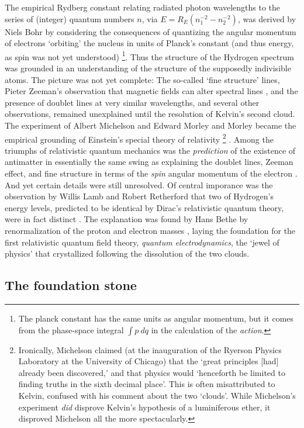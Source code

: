 	The empirical Rydberg constant relating radiated photon wavelengths to the series of (integer) quantum numbers $n$, via $E=R_E(n_{1}^{-2}-n_{2}^{-2})$, was derived by Niels Bohr by considering the consequences of quantizing the angular momentum of electrons `orbiting' the nucleus in units of Planck's constant (and thus energy, as spin was not yet understood) \cite{Bohr1913}
	\footnote{The planck constant has the same units as angular momentum, but it comes from the phase-space integral $\int p~dq$ in the calculation of the \emph{action}.}.
	Thus the structure of the Hydrogen spectrum was grounded in an understanding of the structure of the supposedly indivisible atoms. 
	The picture was not yet complete: The so-called `fine structure' lines, Pieter Zeeman's observation that magnetic fields can alter spectral lines \cite{Zeeman1897}, and the presence of doublet lines at very similar wavelengths, and several other observations, remained unexplained until the resolution of Kelvin's second cloud.
	The experiment of Albert Michelson and Edward Morley and Morley became the empirical grounding of Einstein's special theory of relativity 
	\footnote{Ironically, Michelson claimed (at the inauguration of the Ryerson Physics Laboratory at the University of Chicago) that the `great principles [had] already been discovered,' and that physics would `henceforth be limited to finding truths in the sixth decimal place'. This is often misattributed to Kelvin, confused with his comment about the two `clouds'. While Michelson's experiment \emph{did} disprove Kelvin's hypothesis of a luminiferous ether, it disproved Michelson all the more spectacularly.} \cite{Michelson1887}.
	Among the triumphs of relativistic quantum mechanics was the \emph{prediction} of the existence of antimatter in essentially the same swing as explaining the doublet lines, Zeeman effect, and fine structure in terms of the \emph{spin} angular momentum of the electron \cite{DiracH}.
	And yet certain details were still unresolved. 
	Of central imporance was the observation by Willis Lamb and Robert Retherford that two of Hydrogen's energy levels, predicted to be identical by Dirac's relativistic quantum theory, were in fact distinct \cite{Lamb47,Lamb50}.
	The explanation was found by Hans Bethe by renormalization of the proton and electron masses \cite{Bethe47}, laying the foundation for the first relativistic quantum field theory, \emph{quantum electrodynamics}, the `jewel of physics' that crystallized following the dissolution of the two clouds.

	
\subsection*{The foundation stone}

